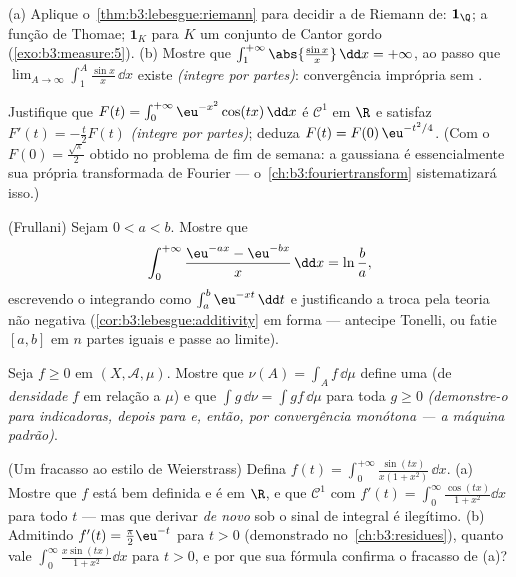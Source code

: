 \begin{exercise}[$\star\star$]\label{exo:b3:lebesgue:6}
(a) Aplique o~\cref{thm:b3:lebesgue:riemann} para decidir a  de Riemann
de: $\mathbf 1_\Q$; a função de Thomae; $\mathbf
1_K$ para $K$ um conjunto de Cantor
gordo (\cref{exo:b3:measure:5}).
(b) Mostre que $\int_1^{+\infty}\abs{\frac{\sin x}x}\,\dd x =
+\infty$, ao passo que $\lim_{A\to\infty}\int_1^A\frac{\sin
x}x\,\dd x$ existe \emph{(integre por
partes)}: convergência imprópria sem .
\end{exercise}

\begin{exercise}[$\star\star$]\label{exo:b3:lebesgue:7}
Justifique que $F(t) = \int_0^{+\infty}\eu^{-x^2}\cos(tx)\,\dd x$ é $\mathcal C^1$ em $\R$ e satisfaz $F'(t) = -\frac t2F(t)$ \emph{(integre
por partes)}; deduza $F(t) =
F(0)\,\eu^{-t^2/4}$. (Com o $F(0) = \frac{\sqrt\pi}2$ obtido no problema de fim de
semana: a gaussiana é essencialmente sua própria transformada de
Fourier --- o~\cref{ch:b3:fouriertransform} sistematizará isso.)
\end{exercise}

\begin{exercise}[$\star\star\star$]\label{exo:b3:lebesgue:8}
(Frullani) Sejam $0 < a < b$. Mostre que
\[
\int_0^{+\infty}\frac{\eu^{-ax} - \eu^{-bx}}{x}\,\dd x =
\ln\frac ba,
\]
escrevendo o integrando como $\int_a^b \eu^{-xt}\,\dd t$ e justificando a troca pela teoria
não negativa (\cref{cor:b3:lebesgue:additivity} em forma  --- antecipe Tonelli, ou
fatie $[a,b]$ em $n$ partes iguais e passe ao limite).
\end{exercise}

\begin{exercise}[$\star\star$]\label{exo:b3:lebesgue:9}
Seja $f \geq 0$  em $(X, \mathcal A, \mu)$. Mostre que $\nu(A) = \int_A f\,\dd\mu$ define uma  (de
\emph{densidade} $f$ em relação a
$\mu$) e que $\int g\,\dd\nu = \int gf\,\dd\mu$ para toda $g \geq 0$  \emph{(demonstre-o
para indicadoras, depois para  e, então, por
convergência monótona --- a máquina padrão)}.
\end{exercise}

\begin{exercise}[$\star\star\star$]\label{exo:b3:lebesgue:10}
(Um fracasso ao estilo de Weierstrass) Defina $f(t) =
\int_0^{+\infty}\frac{\sin(tx)}{x(1 + x^2)}\,\dd x$.
(a) Mostre que $f$ está bem definida e é  em $\R$, e que
$\mathcal C^1$ com $f'(t) = \int_0^\infty\frac{\cos(tx)}{1 +
x^2}\dd x$ para todo $t$ --- mas que derivar \emph{de novo} sob
o sinal de integral é ilegítimo.
(b) Admitindo $f'(t) = \frac\pi2\eu^{-t}$ para $t > 0$ (demonstrado no~\cref{ch:b3:residues}),
quanto vale $\int_0^\infty\frac{x\sin(tx)}{1+x^2}\dd x$ para $t > 0$, e por que sua fórmula confirma o
fracasso de (a)?
\end{exercise}

